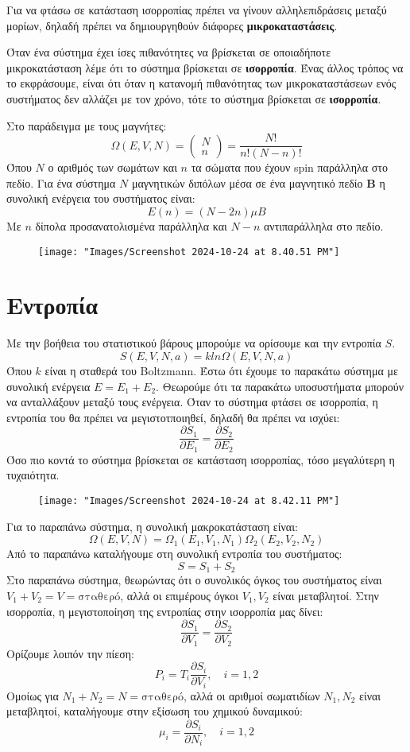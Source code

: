 \documentclass[11pt, oneside]{article}   	%
\begin{document}
Για να φτάσω σε κατάσταση ισορροπίας πρέπει να γίνουν αλληλεπιδράσεις μεταξύ μορίων, δηλαδή πρέπει να δημιουργηθούν διάφορες \textbf{μικροκαταστάσεις}.

Όταν ένα σύστημα έχει ίσες πιθανότητες να βρίσκεται σε οποιαδήποτε μικροκατάσταση λέμε ότι το σύστημα βρίσκεται σε \textbf{ισορροπία}. Ένας άλλος τρόπος να το εκφράσουμε, είναι ότι όταν η κατανομή πιθανότητας των μικροκαταστάσεων ενός συστήματος δεν αλλάζει με τον χρόνο, τότε το σύστημα βρίσκεται σε \textbf{ισορροπία}.

Στο παράδειγμα με τους μαγνήτες:
\[\Omega(E,V,N) = \begin{pmatrix}N \\ n\end{pmatrix} = \frac{N!}{n!(N-n)!}\]
Όπου $N$ ο αριθμός των σωμάτων και $n$ τα σώματα που έχουν spin παράλληλα στο πεδίο.
Για ένα σύστημα $N$ μαγνητικών διπόλων μέσα σε ένα μαγνητικό πεδίο $\mathbf{B}$ η συνολική ενέργεια του συστήματος είναι:
\[E(n)=(N-2n)\mu B\]
Με $n$ δίπολα προσανατολισμένα παράλληλα και $N-n$ αντιπαράλληλα στο πεδίο.
\begin{figure}[H]
	\centering
	\texttt{[image: "Images/Screenshot 2024-10-24 at 8.40.51 PM"]}
	\caption{}
	\label{fig:screenshot-2024-10-24-at-8}
\end{figure}


\section{Εντροπία}
Με την βοήθεια του στατιστικού βάρους μπορούμε να ορίσουμε και την εντροπία $S$.
\[S(E,V,N,a) = k ln\Omega(E,V,N,a)\]
Όπου $k$ είναι η σταθερά του Boltzmann.
Έστω ότι έχουμε το παρακάτω σύστημα με συνολική ενέργεια $E=E_1+E_2$.
Θεωρούμε ότι τα παρακάτω υποσυστήματα μπορούν να ανταλλάξουν μεταξύ τους ενέργεια.
Όταν το σύστημα φτάσει σε ισορροπία, η εντροπία του θα πρέπει να μεγιστοτποιηθεί, δηλαδή θα πρέπει να ισχύει:
\[\frac{\partial S_1}{\partial E_1}=\frac{\partial S_2}{\partial E_2}\]
Όσο πιο κοντά το σύστημα βρίσκεται σε κατάσταση ισορροπίας, τόσο μεγαλύτερη η τυχαιότητα.
\begin{figure}[H]
	\centering
	\texttt{[image: "Images/Screenshot 2024-10-24 at 8.42.11 PM"]}
	\caption{}
	\label{fig:screenshot-2024-10-24-at-8}
\end{figure}

Για το παραπάνω σύστημα, η συνολική μακροκατάσταση είναι:
\[\Omega(E,V,N) = \Omega_1(E_1,V_1,N_1) \Omega_2(E_2,V_2,N_2)\]
Από το παραπάνω καταλήγουμε στη συνολική εντροπία του συστήματος:
\[S=S_1+S_2\]
Στο παραπάνω σύστημα, θεωρώντας ότι ο συνολικός όγκος του συστήματος είναι $V_1+V_2=V=\text{σταθερό}$, αλλά οι επιμέρους όγκοι $V_1,V_2$ είναι μεταβλητοί.
Στην ισορροπία, η μεγιστοποίηση της εντροπίας στην ισορροπία μας δίνει:
\[\frac{\partial S_1}{\partial V_1} = \frac{\partial S_2}{\partial V_2}\]
Ορίζουμε λοιπόν την πίεση:
\[P_i = T_i \frac{\partial S_i}{\partial V_i}, \quad i=1,2\]
Ομοίως για $N_1+N_2=N=\text{σταθερό}$, αλλά οι αριθμοί σωματιδίων $N_1,N_2$ είναι μεταβλητοί, καταλήγουμε στην εξίσωση του χημικού δυναμικού:
\[\mu_i = \frac{\partial S_i}{\partial N_i}, \quad i=1,2\]
\end{document}
